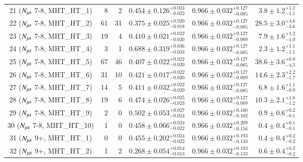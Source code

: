 \begin{table}[h]
\begin{tabular}{|c|rr|c|c|r|}
\hline                                 															      
 21 ($N_{\rm jet}$ 7-8, MHT\_HT\_1)   &    8 &     2 & $0.454\pm0.126^{+0.024}_{-0.022}$ & $0.966\pm0.032^{+0.127}_{-0.085}$ & $   3.8\pm 1.2^{+ 1.2}_{- 1.1}$ \\      
 22 ($N_{\rm jet}$ 7-8, MHT\_HT\_2)   &   61 &    31 & $0.375\pm0.025^{+0.020}_{-0.018}$ & $0.966\pm0.032^{+0.127}_{-0.085}$ & $  28.5\pm 3.0^{+ 4.6}_{- 3.6}$ \\      
 23 ($N_{\rm jet}$ 7-8, MHT\_HT\_3)   &   19 &     4 & $0.410\pm0.021^{+0.022}_{-0.020}$ & $0.966\pm0.032^{+0.127}_{-0.089}$ & $   7.9\pm 1.6^{+ 1.2}_{- 1.0}$ \\      
 24 ($N_{\rm jet}$ 7-8, MHT\_HT\_4)   &    3 &     1 & $0.688\pm0.319^{+0.036}_{-0.033}$ & $0.966\pm0.032^{+0.127}_{-0.085}$ & $   2.3\pm 1.2^{+ 1.1}_{- 1.1}$ \\      
 25 ($N_{\rm jet}$ 7-8, MHT\_HT\_5)   &   67 &    46 & $0.407\pm0.022^{+0.022}_{-0.020}$ & $0.966\pm0.032^{+0.127}_{-0.085}$ & $  38.6\pm 3.6^{+ 6.0}_{- 4.5}$ \\      
 26 ($N_{\rm jet}$ 7-8, MHT\_HT\_6)   &   31 &    10 & $0.421\pm0.017^{+0.022}_{-0.020}$ & $0.966\pm0.032^{+0.127}_{-0.089}$ & $  14.6\pm 2.3^{+ 2.2}_{- 1.7}$ \\      
 27 ($N_{\rm jet}$ 7-8, MHT\_HT\_7)   &   14 &     5 & $0.411\pm0.032^{+0.022}_{-0.020}$ & $0.966\pm0.032^{+0.127}_{-0.085}$ & $   6.8\pm 1.6^{+ 1.1}_{- 0.9}$ \\      
 28 ($N_{\rm jet}$ 7-8, MHT\_HT\_8)   &   19 &     6 & $0.474\pm0.026^{+0.025}_{-0.023}$ & $0.966\pm0.032^{+0.127}_{-0.089}$ & $  10.3\pm 2.1^{+ 1.6}_{- 1.2}$ \\      
 29 ($N_{\rm jet}$ 7-8, MHT\_HT\_9)   &    2 &     0 & $0.502\pm0.053^{+0.027}_{-0.024}$ & $0.966\pm0.032^{+0.160}_{-0.102}$ & $   0.9\pm 0.6^{+ 0.2}_{- 0.1}$ \\      
 30 ($N_{\rm jet}$ 7-8, MHT\_HT\_10)  &    1 &     0 & $0.458\pm0.066^{+0.024}_{-0.022}$ & $0.966\pm0.032^{+0.209}_{-0.156}$ & $   0.4\pm 0.4^{+ 0.1}_{- 0.1}$ \\      
\hline                                 															      
 31 ($N_{\rm jet}$ 9+, MHT\_HT\_1)    &    0 &     0 & $0.455\pm0.202^{+0.024}_{-0.022}$ & $0.966\pm0.032^{+0.193}_{-0.133}$ & $   0.4\pm 0.4^{+ 0.2}_{- 0.2}$ \\    
 32 ($N_{\rm jet}$ 9+, MHT\_HT\_2)    &    1 &     2 & $0.268\pm0.054^{+0.014}_{-0.013}$ & $0.966\pm0.032^{+0.193}_{-0.133}$ & $   0.6\pm 0.4^{+ 0.2}_{- 0.2}$ \\      

\end{tabular}
\end{table}
